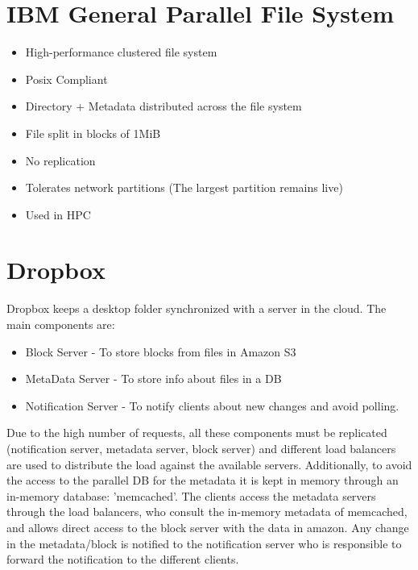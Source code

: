 \section{IBM General Parallel File System}
\begin{itemize}
  \item High-performance clustered file system
  \item Posix Compliant
  \item Directory + Metadata distributed across the file system
  \item File split in blocks of 1MiB
  \item No replication
  \item Tolerates network partitions (The largest partition remains live)
  \item Used in HPC
\end{itemize}

\section{Dropbox}
Dropbox keeps a desktop folder synchronized with a server in the cloud.
The main components are:
\begin{itemize}
  \item Block Server - To store blocks from files in Amazon S3
  \item MetaData Server - To store info about files in a DB
  \item Notification Server - To notify clients about new changes and avoid polling.
\end{itemize}
Due to the high number of requests, all these components must be replicated (notification server,
metadata server, block server) and different load balancers are used to distribute the load against
the available servers.
Additionally, to avoid the access to the parallel DB for the metadata it is kept in memory
through an in-memory database: 'memcached'.
The clients access the metadata servers through the load balancers, who consult the in-memory
metadata of memcached, and allows direct access to the block server with the data in amazon.
Any change in the metadata/block is notified to the notification server who is responsible to
forward the notification to the different clients.


